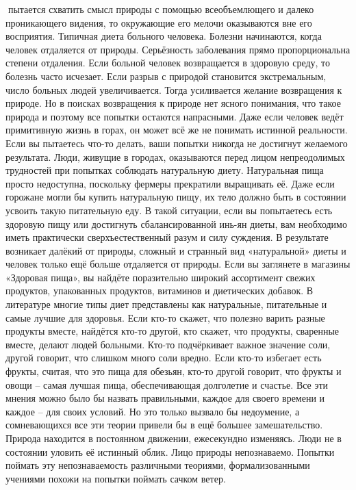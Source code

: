 \documentclass[a4paper]{book}
\begin{document}
пытается схватить смысл природы с помощью всеобъемлющего и далеко проникающего
видения, то окружающие его мелочи оказываются вне его восприятия.
Типичная диета больного человека. Болезни начинаются, когда человек отдаляется от
природы. Серьёзность заболевания прямо пропорциональна степени отдаления. Если
больной человек возвращается в здоровую среду, то болезнь часто исчезает. Если разрыв с
природой становится экстремальным, число больных людей увеличивается. Тогда
усиливается желание возвращения к природе. Но в поисках возвращения к природе нет
ясного понимания, что такое природа и поэтому все попытки остаются напрасными.
Даже если человек ведёт примитивную жизнь в горах, он может всё же не понимать
истинной реальности. Если вы пытаетесь что-то делать, ваши попытки никогда не достигнут
желаемого результата.
Люди, живущие в городах, оказываются перед лицом непреодолимых трудностей при
попытках соблюдать натуральную диету. Натуральная пища просто недоступна, поскольку
фермеры прекратили выращивать её. Даже если горожане могли бы купить натуральную
пищу, их тело должно быть в состоянии усвоить такую питательную еду.
В такой ситуации, если вы попытаетесь есть здоровую пищу или достигнуть
сбалансированной инь-ян диеты, вам необходимо иметь практически сверхъестественный
разум и силу суждения. В результате возникает далёкий от природы, сложный и странный
вид «натуральной» диеты и человек только ещё больше отдаляется от природы.
Если вы заглянете в магазины «Здоровая пища», вы найдёте поразительно широкий
ассортимент свежих продуктов, упакованных продуктов, витаминов и диетических добавок.
В литературе многие типы диет представлены как натуральные, питательные и самые
лучшие для здоровья. Если кто-то скажет, что полезно варить разные продукты вместе,
найдётся кто-то другой, кто скажет, что продукты, сваренные вместе, делают людей
больными. Кто-то подчёркивает важное значение соли, другой говорит, что слишком много
соли вредно. Если кто-то избегает есть фрукты, считая, что это пища для обезьян, кто-то
другой говорит, что фрукты и овощи – самая лучшая пища, обеспечивающая долголетие и
счастье. Все эти мнения можно было бы назвать правильными, каждое для своего времени и
каждое – для своих условий. Но это только вызвало бы недоумение, а сомневающихся все эти
теории привели бы в ещё большее замешательство.
Природа находится в постоянном движении, ежесекундно изменяясь. Люди не в
состоянии уловить её истинный облик. Лицо природы непознаваемо. Попытки поймать эту
непознаваемость различными теориями, формализованными учениями похожи на попытки
поймать сачком ветер.
\end{document}
